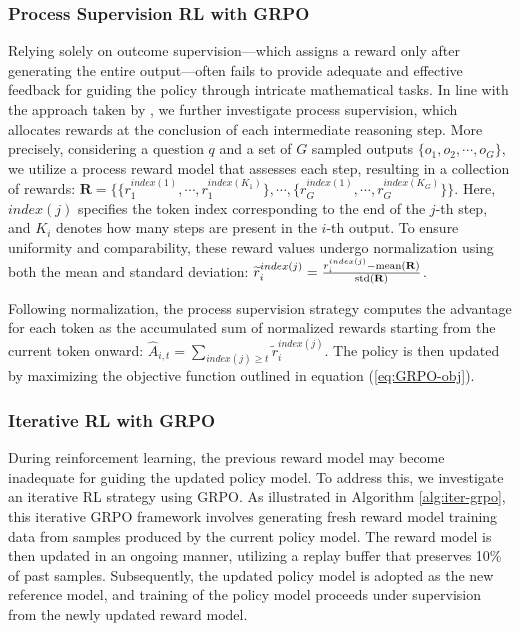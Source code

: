 \subsubsection{Process Supervision RL with GRPO}

Relying solely on outcome supervision—which assigns a reward only after generating the entire output—often fails to provide adequate and effective feedback for guiding the policy through intricate mathematical tasks. In line with the approach taken by \cite{wang2023math}, we further investigate process supervision, which allocates rewards at the conclusion of each intermediate reasoning step. More precisely, considering a question $q$ and a set of $G$ sampled outputs $\{o_1, o_2, \cdots, o_G\}$, we utilize a process reward model that assesses each step, resulting in a collection of rewards: $\mathbf{R} = \{ \{r_1^{index(1)},\cdots,r_1^{index(K_1)}\}, \cdots,  \{r_G^{index(1)},\cdots,r_G^{index(K_G)}\} \}$. Here, $index(j)$ specifies the token index corresponding to the end of the $j$-th step, and $K_i$ denotes how many steps are present in the $i$-th output. To ensure uniformity and comparability, these reward values undergo normalization using both the mean and standard deviation: $\widetilde{r}_i^{index(j)} = \frac{r_i^{index(j)} - {\rm mean(\mathbf{R})}}{{\rm std(\mathbf{R})}}$.

Following normalization, the process supervision strategy computes the advantage for each token as the accumulated sum of normalized rewards starting from the current token onward: $\hat{A}_{i, t} = \sum_{index(j) \ge t} \widetilde{r}_i^{index(j)}$. The policy is then updated by maximizing the objective function outlined in equation (\ref{eq:GRPO-obj}).

\subsubsection{Iterative RL with GRPO} During reinforcement learning, the previous reward model may become inadequate for guiding the updated policy model. To address this, we investigate an iterative RL strategy using GRPO. As illustrated in Algorithm \ref{alg:iter-grpo}, this iterative GRPO framework involves generating fresh reward model training data from samples produced by the current policy model. The reward model is then updated in an ongoing manner, utilizing a replay buffer that preserves 10\% of past samples. Subsequently, the updated policy model is adopted as the new reference model, and training of the policy model proceeds under supervision from the newly updated reward model.

